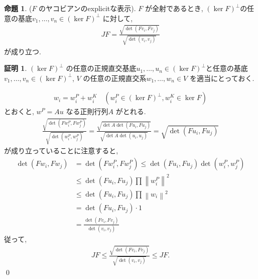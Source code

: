 \documentclass[10pt, fleqn, label-section=none]{bxjsarticle}
\theoremstyle{definition}
\newtheorem{prop}[dfn]{命題}
\newtheorem*{pf*}{証明}
\newcommand{\norm}[1]{\left\|#1\right\|}
\renewcommand{\;}{\, ; \,}
\begin{document}
\begin{prop}($F$ のヤコビアンのexplicitな表示). $F$ が全射であるとき, $(\ker F)^\perp $の任意の基底$v_1, \ldots, v_n \in (\ker F)^\perp $ に対して, 
\begin{align*} JF = \frac{ \sqrt{\det (Fv_i, Fv_j)  }}{\sqrt{ \det (v_i, v_j) } }  \end{align*}
が成り立つ. 
\end{prop}
\begin{pf*}
$(\ker F)^\perp $ の任意の正規直交基底$u_1, \ldots, u_n \in (\ker F)^\perp$と任意の基底$v_1, \ldots, v_n \in (\ker F)^\perp$, $V$ の任意の正規直交系$w_1, \ldots , w_n \in V$ を適当にとっておく. 

\begin{align*} w_i = w^P_i + w^K_i \quad(w^P_i \in (\ker F)^\perp,  w^K_i \in \ker F) \end{align*}
とおくと, $w^ P = A u$ なる正則行列$A$ がとれる. 
 \begin{align*}  \frac{ \sqrt{\det (Fw^P_i, Fw^P_j)  } }{\sqrt{ \det (w^P_i, w^P_j) } } = \frac{ \sqrt{ \det A \det (Fu_i, Fu_j)  } }{\sqrt{ \det A \det (u_i, u_j) } }  =  \sqrt{\det (Fu_i, Fu_j)  }  \end{align*}
が成り立っていることに注意すると, 
\begin{align*} \det (Fw_i, Fw_j) &= \det(Fw^P_i, Fw^P_j) \leq \det (Fu_i, Fu_j) \det (w^P_i, w^P_j)  \\&
\leq \det (Fu_i, Fu_j) \prod \norm{w^P_i}^2 \\
&\leq \det (Fu_i, Fu_j) \prod \norm{w_i}^2 \\
&= \det (Fu_i, Fu_j) \cdot 1 \\
&= \frac{{\det (Fv_i, Fv_j)  } }{{ \det (v_i, v_j) } } 
\end{align*}
従って, 
\begin{align*} JF \leq \frac{ \sqrt{\det (Fv_i, Fv_j)  }}{\sqrt{ \det (v_i, v_j) } }  \leq JF.  \end{align*}
\qed
\end{pf*}
\end{document}
